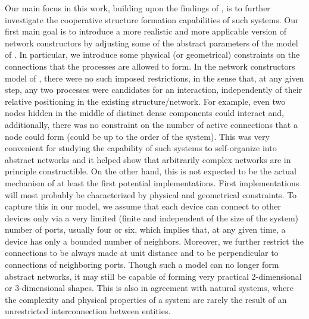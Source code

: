 \documentclass[oribibl, 11pt]{llncs}
\begin{document}
Our main focus in this work, building upon the findings of \cite{MS14}, is to further investigate the cooperative structure formation capabilities of such systems. Our first main goal is to introduce a more realistic and more applicable version of network constructors by adjusting some of the abstract parameters of the model of \cite{MS14}. In particular, we introduce some physical (or geometrical) constraints on the connections that the processes are allowed to form. In the network constructors model of \cite{MS14}, there were no such imposed restrictions, in the sense that, at any given step, any two processes were candidates for an interaction, independently of their relative positioning in the existing structure/network. For example, even two nodes hidden in the middle of distinct dense components could interact and, additionally, there was no constraint on the number of active connections that a node could form (could be up to the order of the system). This was very convenient for studying the capability of such systems to self-organize into abstract networks and it helped show that arbitrarily complex networks are in principle constructible. On the other hand, this is not expected to be the actual mechanism of at least the first potential implementations. First implementations will most probably be characterized by physical and geometrical constraints. To capture this in our model, we assume that each device can connect to other devices only via a very limited (finite and independent of the size of the system) number of ports, usually four or six, which implies that, at any given time, a device has only a bounded number of neighbors. Moreover, we further restrict the connections to be always made at unit distance and to be perpendicular to connections of neighboring ports. Though such a model can no longer form abstract networks, it may still be capable of forming very practical 2-dimensional or 3-dimensional shapes. This is also in agreement with natural systems, where the complexity and physical properties of a system are rarely the result of an unrestricted interconnection between entities. 
\end{document}
